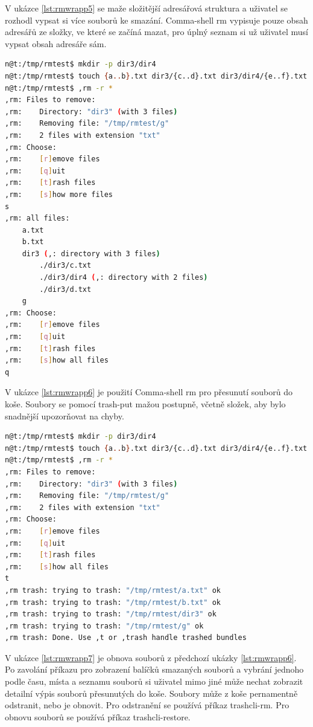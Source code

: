 \documentclass[thesis=M,czech]{FITthesis}[2012/06/26]
\begin{document}
V ukázce \ref{lst:rmwrapp5} se maže složitější adresářová struktura a uživatel se rozhodl vypsat si více souborů ke smazání. Comma-shell rm vypisuje pouze obsah adresářů ze složky, ve které se začíná mazat, pro úplný seznam si už uživatel musí vypsat obsah adresáře sám.

\begin{minipage}{\linewidth}
\begin{lstlisting}[language=bash, caption={rm s }, label={lst:rmwrapp5}]
n@t:/tmp/rmtest$ mkdir -p dir3/dir4
n@t:/tmp/rmtest$ touch {a..b}.txt dir3/{c..d}.txt dir3/dir4/{e..f}.txt g
n@t:/tmp/rmtest$ ,rm -r *
,rm: Files to remove:
,rm:    Directory: "dir3" (with 3 files)
,rm:    Removing file: "/tmp/rmtest/g"
,rm:    2 files with extension "txt"
,rm: Choose:
,rm:    [r]emove files
,rm:    [q]uit
,rm:    [t]rash files
,rm:    [s]how more files
s
,rm: all files:
    a.txt
    b.txt
    dir3 (,: directory with 3 files)
        ./dir3/c.txt
        ./dir3/dir4 (,: directory with 2 files)
        ./dir3/d.txt
    g
,rm: Choose:
,rm:    [r]emove files
,rm:    [q]uit
,rm:    [t]rash files
,rm:    [s]how all files
q
\end{lstlisting}
\end{minipage}

V ukázce \ref{lst:rmwrapp6} je použití Comma-shell rm pro přesunutí souborů do koše. Soubory se pomocí trash-put mažou postupně, včetně složek, aby bylo snadnější upozorňovat na chyby.


\begin{minipage}{\linewidth}
\begin{lstlisting}[language=bash, caption={,rm - přesouvání do koše}, label={lst:rmwrapp6}]
n@t:/tmp/rmtest$ mkdir -p dir3/dir4
n@t:/tmp/rmtest$ touch {a..b}.txt dir3/{c..d}.txt dir3/dir4/{e..f}.txt g
n@t:/tmp/rmtest$ ,rm -r *
,rm: Files to remove:
,rm:    Directory: "dir3" (with 3 files)
,rm:    Removing file: "/tmp/rmtest/g"
,rm:    2 files with extension "txt"
,rm: Choose:
,rm:    [r]emove files
,rm:    [q]uit
,rm:    [t]rash files
,rm:    [s]how all files
t
,rm trash: trying to trash: "/tmp/rmtest/a.txt" ok
,rm trash: trying to trash: "/tmp/rmtest/b.txt" ok
,rm trash: trying to trash: "/tmp/rmtest/dir3" ok
,rm trash: trying to trash: "/tmp/rmtest/g" ok
,rm trash: Done. Use ,t or ,trash handle trashed bundles
\end{lstlisting}
\end{minipage}

V ukázce \ref{lst:rmwrapp7} je obnova souborů z předchozí ukázky \ref{lst:rmwrapp6}. Po zavolání příkazu pro zobrazení balíčků smazaných souborů a vybrání jednoho podle času, místa a seznamu souborů si uživatel mimo jiné může nechat zobrazit detailní výpis souborů přesunutých do koše. Soubory může z koše pernamentně odstranit, nebo je obnovit. Pro odstranění se používá příkaz trashcli-rm. Pro obnovu souborů se používá příkaz trashcli-restore. 
\end{document}
